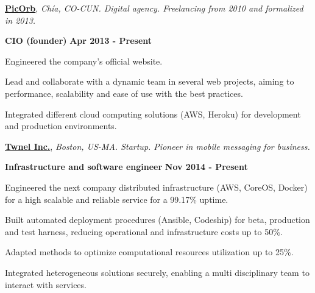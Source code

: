 \quarterblankline

\href{http://www.picorb.com/}{\textbf{PicOrb}}, \textit{Ch\'ia, CO-CUN.
Digital agency. Freelancing from 2010 and formalized in
2013.}

\begin{outerlist}
\item[\FA \faAngleDoubleRight] \textbf{CIO (founder)} \hfill \textbf{Apr 2013 -
Present}
\end{outerlist}

    \begin{innerlist}
\item Engineered the company's official website.
\item Lead and collaborate with a dynamic team in several
web projects, aiming to performance, scalability and ease of use with
the best practices.
\item Integrated different cloud computing solutions (AWS, Heroku) for
development and production environments.
    \end{innerlist}

\quarterblankline

\href{http://www.twnel.com/}{\textbf{Twnel Inc.}}, \textit{Boston, US-MA.
Startup.
Pioneer in mobile messaging for business.}

\begin{outerlist}
\item[\FA \faAngleDoubleRight] \textbf{Infrastructure and software engineer}
\hfill
\textbf{Nov 2014 - Present}
\end{outerlist}

\begin{innerlist}
\item Engineered the next company distributed infrastructure (AWS, CoreOS,
Docker) for a high scalable and reliable service for a 99.17\% uptime.
\item Built automated deployment procedures (Ansible, Codeship) for beta, production and test
harness, reducing
operational and infrastructure costs up to 50\%.
\item Adapted methods to optimize computational resources utilization up to 25\%.
\item Integrated heterogeneous solutions securely, enabling a
multi disciplinary team to interact with services.
\end{innerlist}





%

